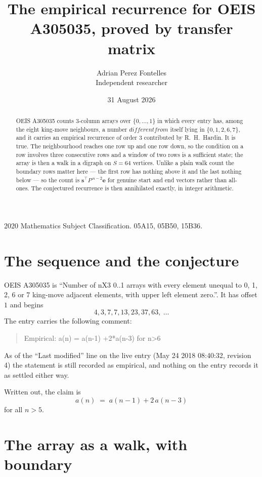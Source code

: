 \documentclass[11pt,a4paper]{article}
\title{The empirical recurrence for OEIS A305035, proved by transfer matrix}
\author{Adrian Perez Fontelles\\ \small Independent researcher}
\date{31 August 2026}
\theoremstyle{plain}
\theoremstyle{definition}
\begin{document}
\maketitle

\begin{abstract}
OEIS A305035 counts $3$-column arrays over $\{0,\dots,1\}$ in which every entry has,
among the eight king-move neighbours, a number $different from$ itself lying in $\{0,1,2,6,7\}$, and it carries an empirical
recurrence of order $3$ contributed by R.~H.~Hardin. It is true. The neighbourhood
reaches one row up and one row down, so the condition on a row involves three consecutive
rows and a window of two rows is a sufficient state; the array is then a walk in a digraph
on $S=64$ vertices. Unlike a plain walk count the boundary rows matter here --- the first
row has nothing above it and the last nothing below --- so the count is
$\mathbf{s}^{\!\top}P^{\,n-2}\mathbf{e}$ for genuine start and end vectors rather than
all-ones. The conjectured recurrence is then annihilated exactly, in integer arithmetic.
\end{abstract}

\noindent\small 2020 Mathematics Subject Classification. 05A15, 05B50, 15B36.\normalsize

\section{The sequence and the conjecture}

OEIS A305035 is ``Number of nX3 0..1 arrays with every element unequal to 0, 1, 2, 6 or 7 king-move adjacent elements, with upper left element zero.''. It has offset
$1$ and begins
\[
4, 3, 7, 7, 13, 23, 37, 63,\ \dots
\]
The entry carries the following comment:
\begin{quote}\small
Empirical: a(n) = a(n-1) +2*a(n-3) for n>6
\end{quote}
As of the ``Last modified'' line on the live entry (May 24 2018 08:40:32, revision
4) the statement is still recorded as empirical, and nothing on the entry
records it as settled either way.

Written out, the claim is
\begin{equation}\label{eq:conj}
a(n)\;=\;a(n-1) + 2\,a(n-3)
\end{equation}
for all $n>5$.

\section{The array as a walk, with boundary}
\end{document}

